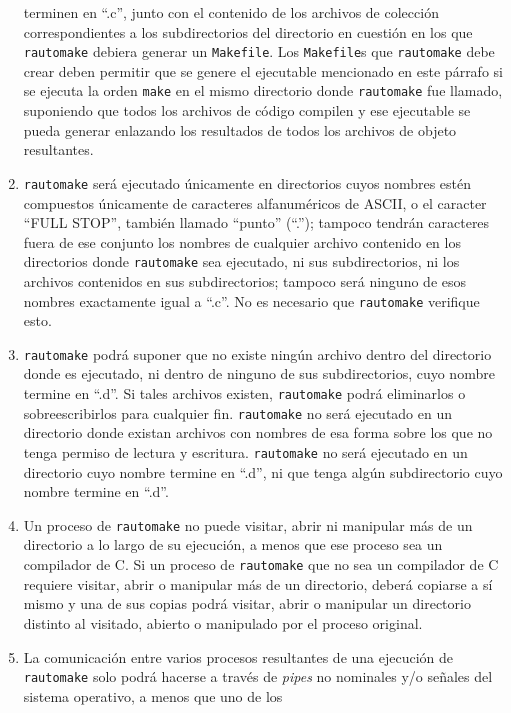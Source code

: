 \documentclass[]{article}
\begin{document}
\begin{enumerate}[1.]
  terminen en ``.c'', junto con el contenido de los archivos de
  colección correspondientes a los subdirectorios del directorio en
  cuestión en los que \texttt{rautomake} debiera generar un
  \texttt{Makefile}. Los \texttt{Makefile}s que \texttt{rautomake} debe
  crear deben permitir que se genere el ejecutable mencionado en este
  párrafo si se ejecuta la orden \texttt{make} en el mismo directorio
  donde \texttt{rautomake} fue llamado, suponiendo que todos los
  archivos de código compilen y ese ejecutable se pueda generar
  enlazando los resultados de todos los archivos de objeto resultantes.
\item
  \texttt{rautomake} será ejecutado únicamente en directorios cuyos
  nombres estén compuestos únicamente de caracteres alfanuméricos de
  ASCII, o el caracter ``FULL STOP'', también llamado ``punto'' (``.'');
  tampoco tendrán caracteres fuera de ese conjunto los nombres de
  cualquier archivo contenido en los directorios donde
  \texttt{rautomake} sea ejecutado, ni sus subdirectorios, ni los
  archivos contenidos en sus subdirectorios; tampoco será ninguno de
  esos nombres exactamente igual a ``.c''. No es necesario que
  \texttt{rautomake} verifique esto.
\item
  \texttt{rautomake} podrá suponer que no existe ningún archivo dentro
  del directorio donde es ejecutado, ni dentro de ninguno de sus
  subdirectorios, cuyo nombre termine en ``.d''. Si tales archivos
  existen, \texttt{rautomake} podrá eliminarlos o sobreescribirlos para
  cualquier fin. \texttt{rautomake} no será ejecutado en un directorio
  donde existan archivos con nombres de esa forma sobre los que no tenga
  permiso de lectura y escritura. \texttt{rautomake} no será ejecutado
  en un directorio cuyo nombre termine en ``.d'', ni que tenga algún
  subdirectorio cuyo nombre termine en ``.d''.
\item
  Un proceso de \texttt{rautomake} no puede visitar, abrir ni manipular
  más de un directorio a lo largo de su ejecución, a menos que ese
  proceso sea un compilador de C. Si un proceso de \texttt{rautomake}
  que no sea un compilador de C requiere visitar, abrir o manipular más
  de un directorio, deberá copiarse a sí mismo y una de sus copias podrá
  visitar, abrir o manipular un directorio distinto al visitado, abierto
  o manipulado por el proceso original.
\item
  La comunicación entre varios procesos resultantes de una ejecución de
  \texttt{rautomake} solo podrá hacerse a través de \emph{pipes} no
  nominales y/o señales del sistema operativo, a menos que uno de los

\end{enumerate}
\end{document}
